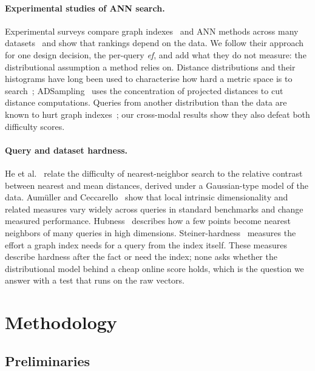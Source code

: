 \documentclass[sigconf,anonymous]{acmart}
\newcommand{\ef}{\textit{ef}}
\begin{document}
\paragraph{Experimental studies of ANN search.}
Experimental surveys compare graph indexes~\cite{wang2021graphsurvey} and ANN methods across many
datasets~\cite{li2020annexperiments,aumuller2020annbenchmarks} and show that rankings depend on the
data. We follow their approach for one design decision, the per-query \ef{}, and add what they do not
measure: the distributional assumption a method relies on. Distance distributions and their
histograms have long been used to characterise how hard a metric space is to search~\cite{chavez2001metric};
ADSampling~\cite{gao2023adsampling} uses the concentration of projected distances to cut distance
computations. Queries from another distribution than the data are known to hurt graph
indexes~\cite{jaiswal2022ooddiskann,chen2024roargraph}; our cross-modal results show they also defeat
both difficulty scores.

\paragraph{Query and dataset hardness.}
He et al.~\cite{he2012difficulty} relate the difficulty of nearest-neighbor search to the relative
contrast between nearest and mean distances, derived under a Gaussian-type model of the data.
Aum\"uller and Ceccarello~\cite{aumuller2019lid} show that local intrinsic dimensionality and
related measures vary widely across queries in standard benchmarks and change measured performance.
Hubness~\cite{radovanovic2010hubs} describes how a few points become nearest neighbors of many
queries in high dimensions. Steiner-hardness~\cite{wang2024steiner} measures the effort a graph
index needs for a query from the index itself. These measures describe hardness after the fact or
need the index; none asks whether the distributional model behind a cheap online score holds, which
is the question we answer with a test that runs on the raw vectors.

\section{Methodology}

\subsection{Preliminaries}
\end{document}
